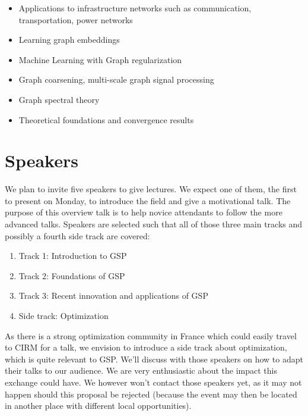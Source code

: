 \documentclass[a4paper]{scrartcl}
\begin{document}
\begin{itemize}
	\item Applications to infrastructure networks such as communication, transportation, power networks \cite{mcgraw,jain2014big,borgnat2011shared}
	\item Learning graph embeddings \cite{von2008consistency,zhou2006learning,belkin2003laplacian}
	\item Machine Learning with Graph regularization \cite{smola,belkin2005towards,zhou2004regularization,zhou2005learning,belkin2006manifold}
	\item Graph coarsening, multi-scale graph signal processing \cite{spielman2011graph,shuman2016multiscale,liu_coarsening,lafon_coarse,jansen}
	\item Graph spectral theory \cite{chung1997spectral,belkin2007convergence,shuman2015vertex,sandryhaila2014discrete,Nakatsukasa2013mysteries,brooks,dekel}
	\item Theoretical foundations and convergence results \cite{belkin2007convergence,von2008consistency}
\end{itemize}

\section{Speakers}

We plan to invite five speakers to give lectures. We expect one of them, the
first to present on Monday, to introduce the field and give a motivational talk.
The purpose of this overview talk is to help novice attendants to follow the
more advanced talks. Speakers are selected such that all of those three
main tracks and possibly a fourth side track are covered:

\begin{enumerate}
	\setlength{\itemsep}{0pt} \setlength{\parskip}{0pt}
	\item Track 1: Introduction to GSP
	\item Track 2: Foundations of GSP
	\item Track 3: Recent innovation and applications of GSP
	\item Side track: Optimization
\end{enumerate} 

As there is a strong optimization community in France which could easily travel
to CIRM for a talk, we envision to introduce a side track about optimization,
which is quite relevant to GSP. We'll discuss with those speakers on how to
adapt their talks to our audience. We are very enthusiastic about the impact
this exchange could have. We however won't contact those speakers yet, as it may
not happen should this proposal be rejected (because the event may then be
located in another place with different local opportunities).
\end{document}
